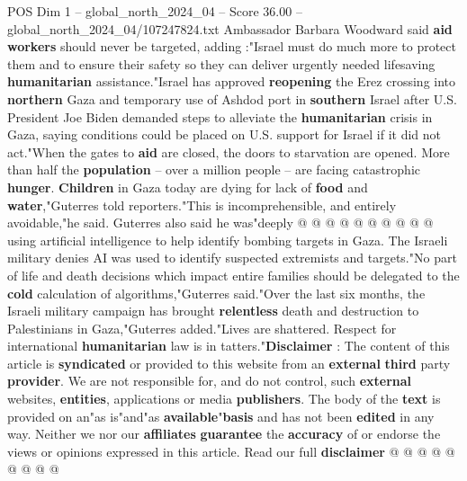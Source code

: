 \begin{textsample}{POS Dim 1 – global\_north\_2024\_04 – Score 36.00 – global\_north\_2024\_04/107247824.txt}
Ambassador Barbara Woodward said \textbf{aid} \textbf{workers} should never be targeted, adding :"Israel must do much more to protect them and to ensure their safety so they can deliver urgently needed lifesaving \textbf{humanitarian} assistance."Israel has approved \textbf{reopening} the Erez crossing into \textbf{northern} Gaza and temporary use of Ashdod port in \textbf{southern} Israel after U.S.
President Joe Biden demanded steps to alleviate the \textbf{humanitarian} crisis in Gaza, saying conditions could be placed on U.S. support for Israel if it did not act."When the gates to \textbf{aid} are closed, the doors to starvation are opened.
More than half the \textbf{population} -- over a million people -- are facing catastrophic \textbf{hunger}. \textbf{Children} in Gaza today are dying for lack of \textbf{food} and \textbf{water},"Guterres told reporters."This is incomprehensible, and entirely avoidable,"he said.
Guterres also said he was"deeply @ @ @ @ @ @ @ @ @ @ using artificial intelligence to help identify bombing targets in Gaza.
The Israeli military denies AI was used to identify suspected extremists and targets."No part of life and death decisions which impact entire families should be delegated to the \textbf{cold} calculation of algorithms,"Guterres said."Over the last six months, the Israeli military campaign has brought \textbf{relentless} death and destruction to Palestinians in Gaza,"Guterres added."Lives are shattered.
Respect for international \textbf{humanitarian} law is in tatters."\textbf{Disclaimer} : The content of this article is \textbf{syndicated} or provided to this website from an \textbf{external} \textbf{third} party \textbf{provider}.
We are not responsible for, and do not control, such \textbf{external} websites, \textbf{entities}, applications or media \textbf{publishers}.
The body of the \textbf{text} is provided on an"as is"and"as \textbf{available}"\textbf{basis} and has not been \textbf{edited} in any way.
Neither we nor our \textbf{affiliates} \textbf{guarantee} the \textbf{accuracy} of or endorse the views or opinions expressed in this article.
Read our full \textbf{disclaimer} @ @ @ @ @ @ @ @ @

\end{textsample}
